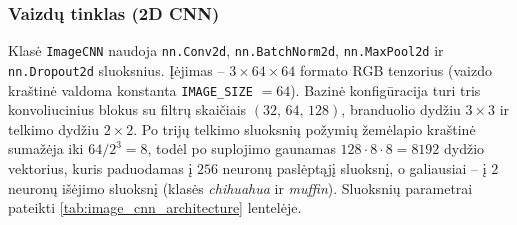 \subsubsection{Vaizdų tinklas (2D CNN)}
\label{subsubsec:image_cnn}

Klasė \texttt{ImageCNN} naudoja \texttt{nn.Conv2d}, \texttt{nn.BatchNorm2d}, \texttt{nn.MaxPool2d} ir \texttt{nn.Dropout2d} sluoksnius. Įėjimas – $3 \times 64 \times 64$ formato RGB tenzorius (vaizdo kraštinė valdoma konstanta \texttt{IMAGE\_SIZE} $= 64$). Bazinė konfigūracija turi tris konvoliucinius blokus su filtrų skaičiais $(32,\,64,\,128)$, branduolio dydžiu $3 \times 3$ ir telkimo dydžiu $2 \times 2$. Po trijų telkimo sluoksnių požymių žemėlapio kraštinė sumažėja iki $64 / 2^{3} = 8$, todėl po suplojimo gaunamas $128 \cdot 8 \cdot 8 = 8192$ dydžio vektorius, kuris paduodamas į $256$ neuronų paslėptąjį sluoksnį, o galiausiai – į $2$ neuronų išėjimo sluoksnį (klasės \textit{chihuahua} ir \textit{muffin}). Sluoksnių parametrai pateikti \ref{tab:image_cnn_architecture} lentelėje.


